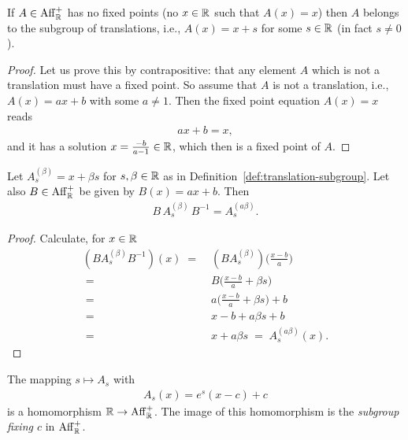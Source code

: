 \begin{lemma}
  \label{lem:no-fixed-point-implies-translation}
  \leanok
  If $A \in \mathrm{Aff}^+_{\mathbb{R}}$ has no fixed points (no $x \in \mathbb{R}$ such that $A(x) = x$)
  then $A$ belongs to the subgroup of translations, i.e., $A(x) = x + s$
  for some $s \in \mathbb{R}$ (in fact $s \ne 0$).
\end{lemma}
\begin{proof}
  Let us prove this by contrapositive: that any element $A$ which is not a
  translation must have a fixed point.
  So assume that $A$ is not a translation, i.e.,
  $A(x) = a x + b$ with some $a \ne 1$. Then the fixed point equation
  $A(x) = x$ reads
  \begin{align*}
    a x + b = x  ,
  \end{align*}
  and it has a solution $x = \frac{-b}{a-1} \in \mathbb{R}$, which then is a
  fixed point of $A$.
\end{proof}

\begin{lemma}
  \label{lem:conjugate-translation}
  Let $A^{(\beta)}_s = x + \beta s$ for $s, \beta \in \mathbb{R}$ as in
  Definition~\ref{def:translation-subgroup}. Let
  also $B \in \mathrm{Aff}^+_{\mathbb{R}}$ be given by $B(x) = a x + b$. Then
  \begin{align*}
    B \, A^{(\beta)}_s \, B^{-1} = A^{(a \beta)}_{s} .
  \end{align*}
\end{lemma}
\begin{proof}
  Calculate, for $x \in \mathbb{R}$
  \begin{align*}
    (B A^{(\beta)}_s B^{-1})(x) \; = \; & (B A^{(\beta)}_s)\big( \frac{x-b}{a} \big) \\
    \; = \; & B\big( \frac{x-b}{a} + \beta s \big) \\
    \; = \; & a \big( \frac{x-b}{a} + \beta s \big) + b \\
    \; = \; & x - b + a \beta s + b \\
    \; = \; & x + a \beta s \; = \; A^{(a \beta)}_s(x).
  \end{align*}
\end{proof}

\begin{definition}
  \label{def:fixing-subgroup}
  The mapping $s \mapsto A_s$ with
  \begin{align*}
    A_s(x) = e^{s} (x - c) + c
  \end{align*}
  is a homomorphism $\mathbb{R} \to \mathrm{Aff}^+_{\mathbb{R}}$. The image of this
  homomorphism is the \emph{subgroup fixing $c$} in $\mathrm{Aff}^+_{\mathbb{R}}$.
\end{definition}

